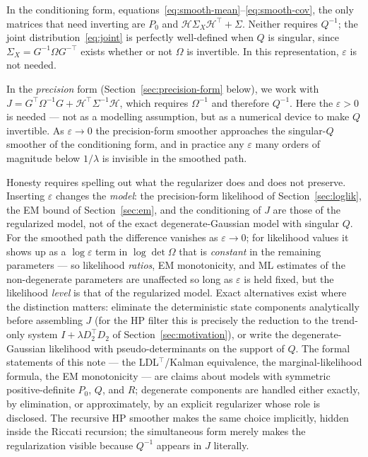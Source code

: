 \documentclass[11pt]{article}
\begin{document}
In the conditioning form, equations~\eqref{eq:smooth-mean}--\eqref{eq:smooth-cov},
the only matrices that need inverting are $P_0$ and $\mathcal H\Sigma_X
\mathcal H^\top+\Sigma$.  Neither requires $Q^{-1}$; the joint
distribution~\eqref{eq:joint} is perfectly well-defined when $Q$ is
singular, since $\Sigma_X=G^{-1}\Omega G^{-\top}$ exists whether or not
$\Omega$ is invertible.  In this representation, $\varepsilon$ is not
needed.

In the \emph{precision} form (Section~\ref{sec:precision-form} below),
we work with $J=G^\top\Omega^{-1}G+\mathcal H^\top\Sigma^{-1}\mathcal H$,
which requires $\Omega^{-1}$ and therefore $Q^{-1}$.  Here the
$\varepsilon>0$ is needed --- not as a modelling assumption, but as a
numerical device to make $Q$ invertible.  As $\varepsilon\to 0$ the
precision-form smoother approaches the singular-$Q$ smoother of the
conditioning form, and in practice any $\varepsilon$ many orders of
magnitude below $1/\lambda$ is invisible in the smoothed path.

Honesty requires spelling out what the regularizer does and does not
preserve.  Inserting $\varepsilon$ changes the \emph{model}: the
precision-form likelihood of Section~\ref{sec:loglik}, the EM bound of
Section~\ref{sec:em}, and the conditioning of $J$ are those of the
regularized model, not of the exact degenerate-Gaussian model with
singular $Q$.  For the smoothed path the difference vanishes as
$\varepsilon\to 0$; for likelihood values it shows up as a
$\log\varepsilon$ term in $\log\det\Omega$ that is \emph{constant} in
the remaining parameters --- so likelihood \emph{ratios}, EM
monotonicity, and ML estimates of the non-degenerate parameters are
unaffected so long as $\varepsilon$ is held fixed, but the likelihood
\emph{level} is that of the regularized model.  Exact alternatives
exist where the distinction matters: eliminate the deterministic state
components analytically before assembling $J$ (for the HP filter this
is precisely the reduction to the trend-only system
$I+\lambda D_2^\top D_2$ of Section~\ref{sec:motivation}), or write
the degenerate-Gaussian likelihood with pseudo-determinants on the
support of $Q$.  The formal statements of this note --- the
LDL$^\top$/Kalman equivalence, the marginal-likelihood formula, the
EM monotonicity --- are claims about models with symmetric
positive-definite $P_0$, $Q$, and $R$; degenerate components are
handled either exactly, by elimination, or approximately, by an
explicit regularizer whose role is disclosed.  The recursive
HP smoother makes the same choice implicitly, hidden inside the
Riccati recursion; the simultaneous form merely makes the
regularization visible because $Q^{-1}$ appears in $J$ literally.
\end{document}
